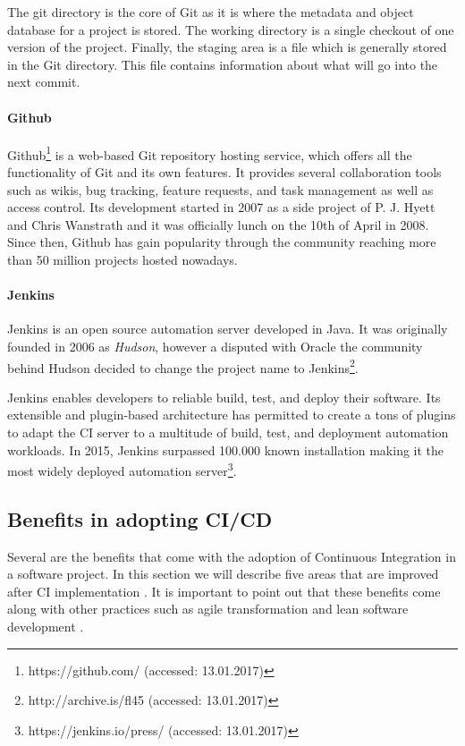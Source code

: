 The git directory is the core of Git as it is where the metadata and object database for a project is stored. The working directory is a single checkout of one version of the project. Finally, the staging area is a file which is generally stored in the Git directory. This file contains information about what will go into the next commit.

\paragraph{Github}

Github\footnote{https://github.com/ (accessed: 13.01.2017)} is a web-based Git repository hosting service, which offers all the functionality of Git and its own features. It provides several collaboration tools such as wikis, bug tracking, feature requests, and task management as well as access control. Its development started in 2007 as a side project of P. J. Hyett and Chris Wanstrath \cite{Weis2014} and it was officially lunch on the 10th of April in 2008. Since then, Github has gain popularity through the community reaching more than 50 million projects hosted nowadays.

\paragraph{Jenkins}
Jenkins is an open source automation server developed in Java. It was originally founded in 2006 as \textit{Hudson}, however a disputed with Oracle the community behind Hudson decided to change the project name to Jenkins\footnote{http://archive.is/fl45 (accessed: 13.01.2017)}.

Jenkins enables developers to reliable build, test, and deploy their software. Its extensible and plugin-based architecture has permitted to create a tons of plugins to adapt the CI server to a multitude of build, test, and deployment automation workloads. In 2015, Jenkins surpassed 100.000 known installation making it the most widely deployed automation server\footnote{https://jenkins.io/press/ (accessed: 13.01.2017)}. 

\subsection{Benefits in adopting CI/CD}
\label{ci-benefits}

Several are the benefits that come with the adoption of Continuous Integration in a software project. In this section we will describe five areas that are improved after CI implementation \cite{Rejstrom2016}. It is important to point out that these benefits come along with other practices such as agile transformation \cite{Laanti2011} and lean software development \cite{Poppendieck2003}.

